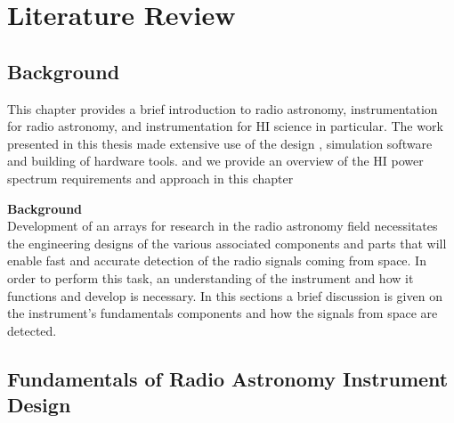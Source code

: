 \chapter{Literature Review}
\label{Chapter 2}


\large {
\section*{Background}
This chapter provides a brief introduction to radio astronomy, instrumentation for
radio astronomy, and instrumentation for HI science in particular. The work presented in this thesis made extensive use of the design , simulation software and building of hardware tools.
and we provide an overview of the HI power spectrum requirements  and approach in this chapter




\textbf{Background}\\
Development of an arrays for research in the radio astronomy field necessitates  the engineering designs of the various associated components and parts that will enable fast and accurate detection of the radio signals coming from space. In order to perform this task, an understanding of the instrument
and how it functions and develop is necessary. In this sections a brief
discussion is given on the instrument's fundamentals components and how the signals from space are  detected.


\section{Fundamentals of Radio Astronomy Instrument Design}

}
